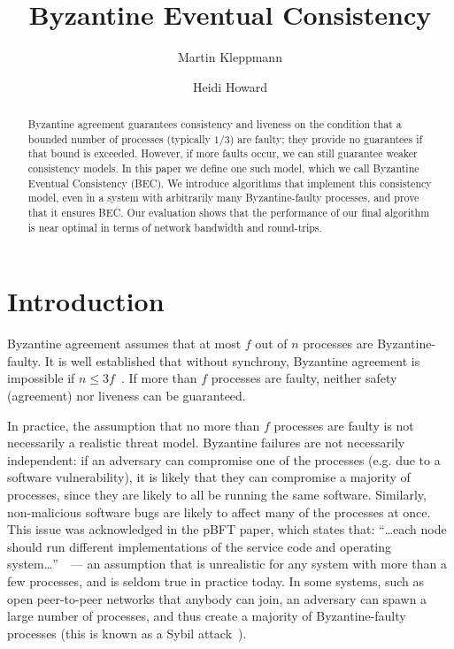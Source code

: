 \documentclass[a4paper,anonymous,USenglish]{lipics-v2019}
\title{Byzantine Eventual Consistency}
\author{Martin Kleppmann}{University of Cambridge}{mk428@cst.cam.ac.uk}{https://orcid.org/0000-0001-7252-6958}{Supported by a Leverhulme Trust Early Career Fellowship and by the Isaac Newton Trust.}
\author{Heidi Howard}{University of Cambridge}{hh360@cst.cam.ac.uk}{https://orcid.org/0000-0001-5256-7664}{}
\begin{document}
\maketitle
\begin{abstract}
    Byzantine agreement guarantees consistency and liveness on the condition that a bounded number of processes (typically $1/3$) are faulty; they provide no guarantees if that bound is exceeded.
    However, if more faults occur, we can still guarantee weaker consistency models. 
    In this paper we define one such model, which we call Byzantine Eventual Consistency (BEC).
    We introduce algorithms that implement this consistency model, even in a system with arbitrarily many Byzantine-faulty processes, and prove that it ensures BEC.
    Our evaluation shows that the performance of our final algorithm is near optimal in terms of network bandwidth and round-trips.
\end{abstract}
\maketitle

\section{Introduction}

Byzantine agreement assumes that at most $f$ out of $n$ processes are Byzantine-faulty.
It is well established that without synchrony, Byzantine agreement is impossible if $n\leq3f$~\cite{Dwork:1988,Lamport:1982}.
If more than $f$ processes are faulty, neither safety (agreement) nor liveness can be guaranteed.

In practice, the assumption that no more than $f$ processes are faulty is not necessarily a realistic threat model.
Byzantine failures are not necessarily independent: if an adversary can compromise one of the processes (e.g. due to a software vulnerability), it is likely that they can compromise a majority of processes, since they are likely to all be running the same software. 
Similarly, non-malicious software bugs are likely to affect many of the processes at once.
This issue was acknowledged in the pBFT paper, which states that: ``{\dots}each node should run different implementations of the service code and operating system{\dots}''~\cite{Castro:1999}~--- an assumption that is unrealistic for any system with more than a few processes, and is seldom true in practice today.
In some systems, such as open peer-to-peer networks that anybody can join, an adversary can spawn a large number of processes, and thus create a majority of Byzantine-faulty processes (this is known as a Sybil attack~\cite{Douceur:2002}).
\end{document}

